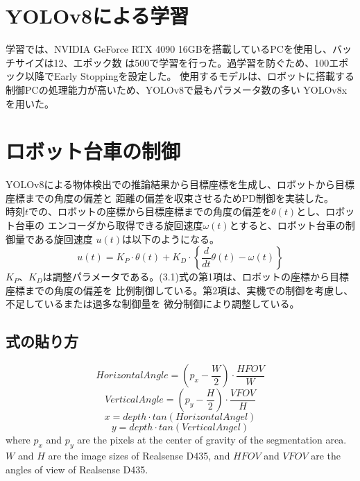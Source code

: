 \section{YOLOv8による学習}
学習では、NVIDIA GeForce RTX 4090 16GBを搭載しているPCを使用し、バッチサイズは12、エポック数
は500で学習を行った。過学習を防ぐため、100エポック以降でEarly Stoppingを設定した。
使用するモデルは、ロボットに搭載する制御PCの処理能力が高いため、YOLOv8で最もパラメータ数の多い
YOLOv8xを用いた。

\section{ロボット台車の制御}
YOLOv8による物体検出での推論結果から目標座標を生成し、ロボットから目標座標までの角度の偏差と
距離の偏差を収束させるためPD制御を実装した。 \\ \indent
時刻$t$での、ロボットの座標から目標座標までの角度の偏差を$\theta(t)$とし、ロボット台車の
エンコーダから取得できる旋回速度$\omega(t)$とすると、ロボット台車の制御量である旋回速度
$u(t)$は以下のようになる。
\begin{equation}
u(t) = K_P \cdot \theta(t) + K_D \cdot \left\{ \frac{d}{dt} \theta(t) - \omega(t) \right\}
\end{equation}
$K_P$、$K_D$は調整パラメータである。(3.1)式の第1項は、ロボットの座標から目標座標までの角度の偏差を
比例制御している。第2項は、実機での制御を考慮し、不足しているまたは過多な制御量を
微分制御により調整している。

\subsection{式の貼り方}
\begin{equation}
HorizontalAngle = (p_x - \frac{W}{2}) \cdot \frac{HFOV}{W}
\end{equation}
\begin{equation}
VerticalAngle = (p_y - \frac{H}{2}) \cdot \frac{VFOV}{H}
\end{equation}
\begin{equation}
x = depth \cdot tan(HorizontalAngel)
\end{equation}
\begin{equation}
y = depth \cdot tan(VerticalAngel)
\end{equation}
where $p_x$ and $p_y$ are the pixels at the center of gravity of the segmentation area. $W$ and $H$ are the image sizes of Realsense D435, and $HFOV$ and $VFOV$ are the angles of view of Realsense D435.
